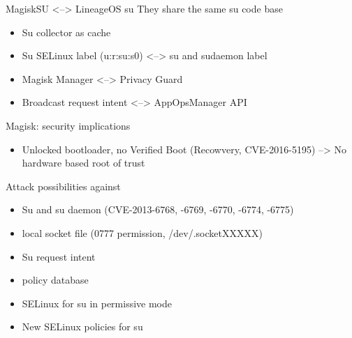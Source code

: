 \documentclass[
    11pt,%
    aspectratio=169,%
]{beamer}
\begin{document}
\begin{frame}{MagiskSU <--> LineageOS su}
They share the same su code base\newline
\begin{itemize}
  \item Su collector as cache\newline
  \item Su SELinux label (u:r:su:s0) <--> su and sudaemon label\newline

  \item Magisk Manager <--> Privacy Guard\newline
  \item Broadcast request intent <--> AppOpsManager API
\end{itemize}
\end{frame}






\begin{frame}{Magisk: security implications}
\begin{itemize}
  \item Unlocked bootloader, no Verified Boot (Recowvery, CVE-2016-5195)\newline
  --> No hardware based root of trust
\end{itemize}
\begin{exampleblock}{Attack possibilities against}
\begin{itemize}
  \item Su and su daemon (CVE-2013-6768, -6769, -6770, -6774, -6775)
  \item local socket file (0777 permission, /dev/.socketXXXXX)
  \item Su request intent
  \item policy database
\end{itemize}
\end{exampleblock}
\begin{itemize}
  \item SELinux for su in permissive mode
  \item New SELinux policies for su
\end{itemize}
\end{frame}
\end{document}
